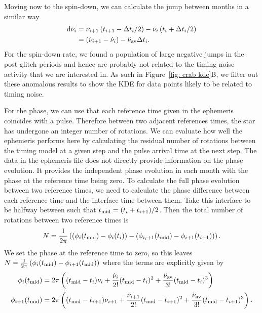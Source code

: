 \documentclass[../full_thesis/full_thesis.tex]{subfiles}
\begin{document}
Moving now to the spin-down, we can calculate the jump between months in a similar way
\begin{align}
\mathrm{d}\dot{\nu}_{i} & = \dot{\nu}_{i+1}\left(t_{i+1}-\Delta t_{i}/2\right) -  \dot{\nu}_{i}\left(t_{i}+\Delta t_{i}/2\right) \\
& = \left(\dot{\nu}_{i+1}-\dot{\nu}_{i}\right) -  \ddot{\nu}_{\textrm{av}} \Delta t_{i}.
\label{eqn: crab spindown residuals}
\end{align}
For the spin-down rate, we found a population of large negative jumps in the
post-glitch periods and hence are probably not related to the timing noise
activity that we are interested in. As such in Figure~\ref{fig: crab kde}B, we
filter out these anomalous results to show the KDE for data points likely to be
related to timing noise.

For the phase, we can use that each reference time given in the ephemeris
coincides with a pulse. Therefore between two adjacent references times, the
star has undergone an integer number of rotations. We can evaluate how well the
ephemeris performs here by calculating the residual number of rotations between
the timing model at a given step and the pulse arrival time at the next step.
The data in the ephemeris file does not directly provide information on the
phase evolution. It provides the independent phase evolution in each month with
the phase at the reference time being zero. To calculate the full phase
evolution between two reference times, we need to calculate the phase
difference between each reference time and the interface time between them.
Take this interface to be halfway between such that $t_{\textrm{mid}}=(t_{i} +
t_{i+1})/2$. Then the total number of rotations between two reference times is
\begin{equation}
    N = \frac{1}{2\pi}\left(\left(\phi_{i}(t_{\textrm{mid}}) - \phi_{i}(t_{i})\right) -
    \left(\phi_{i_i+1}(t_{\textrm{mid}}) - \phi_{i+1}(t_{i+1})\right)\right).
\end{equation}
We set the phase at the reference time to zero, so this leaves $N =
\frac{1}{2\pi}\left(\phi_{i}(t_{\textrm{mid}}) - \phi_{i+1}(t_{\textrm{mid}})\right)$ where the terms
are explicitly given by
\begin{align}
\phi_{i}(t_{\textrm{mid}}) & = 2\pi\left((t_{\textrm{mid}} - t_{i})\nu_{i} +  \frac{\dot{\nu}_{i}}{2!}(t_{\textrm{mid}} - t_{i})^{2}+\frac{\ddot{\nu}_{\textrm{av}}}{3!}(t_{\textrm{mid}} - t_{i})^{3}\right) \\
\phi_{i+1}(t_{\textrm{mid}}) & = 2\pi\left((t_{\textrm{mid}} - t_{i+1})\nu_{i+1} +  \frac{\dot{\nu}_{i+1}}{2!}(t_{\textrm{mid}} - t_{i+1})^{2}+\frac{\ddot{\nu}_{\textrm{av}}}{3!}(t_{\textrm{mid}} - t_{i+1})^{3}\right) .
\end{align}
\end{document}
